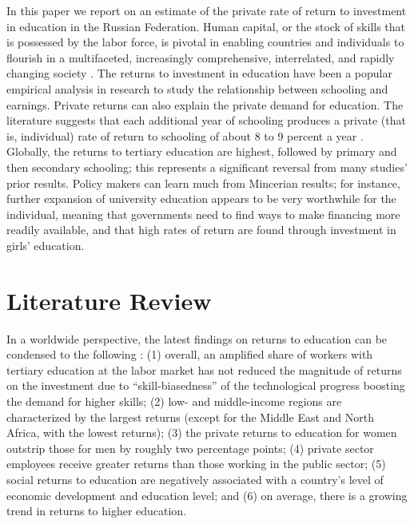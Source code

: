 \documentclass[alpha-refs]{wiley-article-01g}
\begin{document}
In this paper we report on an estimate of the private rate of return to investment in education in the Russian Federation. Human capital, or the stock of skills that is possessed by the labor force, is pivotal in enabling countries and individuals to flourish in a multifaceted, increasingly comprehensive, interrelated, and rapidly changing society \parencite{Schultz1972,Mincer1974,Heckman2003,Becker2009,Broecke2015}. The returns to investment in education have been a popular empirical analysis in research to study the relationship between schooling and earnings. Private returns can also explain the private demand for education. The literature suggests that each additional year of schooling produces a private (that is, individual) rate of return to schooling of about 8 to 9 percent a year \parencite{Psacharopoulos_Patrinos2018,Montenegro_Patrinos2014}. Globally, the returns to tertiary education are highest, followed by primary and then secondary schooling; this represents a significant reversal from many studies' prior results. Policy makers can learn much from Mincerian results; for instance, further expansion of university education appears to be very worthwhile for the individual, meaning that governments need to find ways to make financing more readily available, and that high rates of return are found through investment in girls' education.

\section{Literature Review}

In a worldwide perspective, the latest findings on returns to education can be condensed to the following \parencite{Psacharopoulos_Patrinos2018}: (1) overall, an amplified share of workers with tertiary education at the labor market has not reduced the magnitude of returns on the investment due to ``skill-biasedness'' of the technological progress boosting the demand for higher skills; (2) low- and middle-income regions are characterized by the largest returns (except for the Middle East and North Africa, with the lowest returns); (3) the private returns to education for women outstrip those for men by roughly two percentage points; (4) private sector employees receive greater returns than those working in the public sector; (5) social returns to education are negatively associated with a country's level of economic development and education level; and (6) on average, there is a growing trend in returns to higher education.
\end{document}
